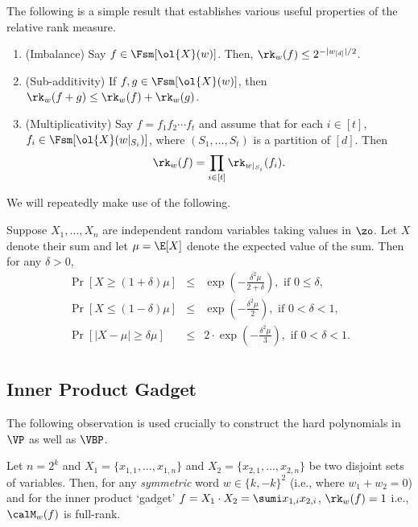 \documentclass{article}
\begin{document}
The following is a simple result that establishes various useful properties of the relative rank measure.
\begin{claim}\label{clm:rk-props}
\begin{enumerate}
    \item(Imbalance) Say $f \in \Fsm[\ol{X}(w)]$. Then, $\rk_w(f)\leq 2^{-|w_{[d]}|/2}$.
    \item(Sub-additivity) If $f,g \in \Fsm[\ol{X}(w)]$, then $\rk_w(f+g)\leq \rk_w(f)+\rk_w(g)$.
    \item(Multiplicativity) Say $f = f_1 f_2\cdots f_t $ and assume that for each $i\in [t]$, $f_i\in \Fsm[\ol{X}(w|_{S_i})]$, where $(S_1, \ldots, S_t)$ is a partition of $[d]$. Then
    \[
    \rk_w(f) = \prod_{i\in[t]} \rk_{w|_{S_i}}(f_i).
    \]
\end{enumerate}
\end{claim}

We will repeatedly make use of the following.

\begin{theorem}\label{thm:Chernoff}
Suppose $X_1, \ldots, X_n$ are independent random variables taking values in $\zo$. Let $X$ denote their sum and let $\mu = \E[X]$ denote the expected value of the sum. Then for any $\delta > 0$,
\begin{eqnarray*} \Pr[X\ge (1+\delta)\mu] &\le& \exp\left(-\frac{\delta^2\mu}{2+\delta}\right), \text{ if }0\leq \delta, \\
  \Pr[X\le (1-\delta)\mu] &\le& \exp\left(-\frac{\delta^2\mu}{2}\right), \text{ if }0< \delta <1, \\ 
  \Pr[|X-\mu|\geq \delta \mu]&\leq& 2\cdot \exp\left(-\frac{\delta^2\mu}{3}\right),\text{ if }0< \delta <1.\\
\end{eqnarray*}
\end{theorem}

\subsection{Inner Product Gadget}
The following observation is used crucially to construct the hard polynomials in $\VP$ as well as $\VBP$. 
\begin{obs}\label{obs:ip-full-rank}
    Let $n = 2^k$ and $X_1 = \{x_{1,1},\ldots,x_{1,n}\}$ and $X_2 = \{x_{2,1},\ldots,x_{2,n}\}$ be two disjoint sets of variables. Then, for any \emph{symmetric} word $w\in\{k,-k\}^2$ (i.e., where $w_1 + w_2 = 0$) and for the inner product `gadget' $ f = X_1\cdot X_2 = \sumi x_{1,i}x_{2,i}$, $\rk_w(f) = 1$ i.e., $\calM_w(f)$ is full-rank.
\end{obs}
\end{document}
